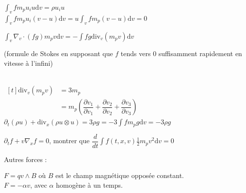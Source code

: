\documentclass[12pt,a4paper]{article}
\begin{document}
\begin{enumerate}[label=\alph*)]
\begin{minipage}[t]{15cm}
{\begin{minipage}[t]{16cm}
				$\displaystyle\int_v fm_p u_i u \mathrm dv = \rho u_i u$\\
				$\displaystyle\int_v fm_p u_i (v-u)\mathrm dv = u\int_v fm_p(v-u)\mathrm dv = 0$
				
				\vspace{.5cm}
				
				$\displaystyle\int_v \nabla_v \cdot (fg) m_p v \mathrm dv = - \int fg \mathrm{div}_v(m_p v) \mathrm dv$ \hspace{1cm} \begin{minipage}[t]{8cm}
					(formule de Stokes en supposant que $f$ tends vers 0 suffisamment rapidement en vitesse à l'infini)
				\end{minipage}\\
				$\begin{aligned}[t]
					\mathrm{div}_v(m_p v) &= 3m_p\\
					&= m_p \left(\dfrac{\partial v_1}{\partial v_1} + \dfrac{\partial v_2}{\partial v_2} + \dfrac{\partial v_3}{\partial v_3}\right)
				\end{aligned}$ \\
				$\partial_t(\rho u) + \mathrm{div}_x\left(\rho u\otimes u\right) = 3\rho g = -3\displaystyle\int fm_pg\mathrm{d}v = -3\rho g$
		\end{minipage}}
	\end{minipage}
	
	\hspace{2.5cm}\begin{minipage}[t]{15cm}
		
		\begin{exo}\begin{minipage}[t]{18cm}
			$\partial_t f + v\nabla_x f = 0$, montrer que $\dfrac{d}{dt} \displaystyle\int f(t,x,v) \frac12 m_p v^2 \mathrm{d}v = 0$
		\end{minipage}
		
		\vspace{-.5cm}
	\end{exo}
	\end{minipage}
	
	\vspace{.5cm}
	
	Autres forces : \begin{minipage}[t]{18.5cm}
		$F = qv\wedge B$ où $B$ est le champ magnétique opposée constant.\\
		$F = -\alpha v$, avec $\alpha$ homogène à un temps.
	\end{minipage}
	
	\vspace{.5cm}
	

\end{enumerate}
\end{document}
